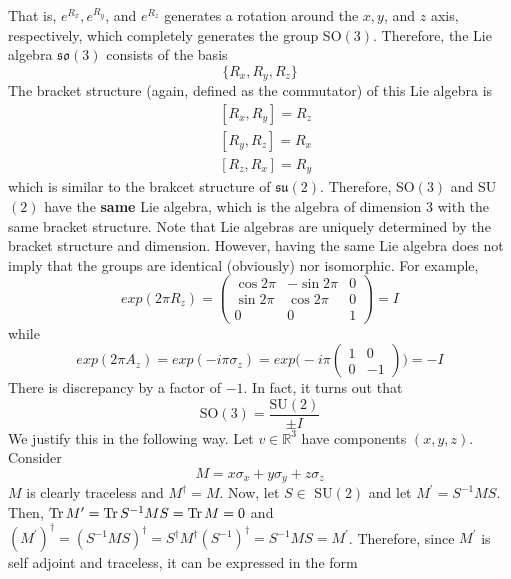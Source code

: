   That is, $e^{R_x}, e^{R_y}$, and $e^{R_z}$ generates a rotation around the $x, y$, and $z$ axis, respectively, which completely generates the group SO$(3)$. Therefore, the Lie algebra $\mathfrak{so}(3)$ consists of the basis 
  \begin{equation}
    \{R_x, R_y, R_z\}
  \end{equation}
  The bracket structure (again, defined as the commutator) of this Lie algebra is 
  \begin{align*}
    & [R_x, R_y] = R_z \\
    & [R_y, R_z] = R_x \\
    & [R_z, R_x] = R_y
  \end{align*}
  which is similar to the brakcet structure of $\mathfrak{su}(2)$. Therefore, SO$(3)$ and SU$(2)$ have the \textbf{same} Lie algebra, which is the algebra of dimension 3 with the same bracket structure. Note that Lie algebras are uniquely determined by the bracket structure and dimension. However, having the same Lie algebra does not imply that the groups are identical (obviously) nor isomorphic. For example, 
  \begin{equation}
    exp(2\pi R_z) = \begin{pmatrix}
    \cos{2\pi} & -\sin{2\pi} & 0 \\
    \sin{2\pi} & \cos{2\pi} & 0 \\
    0 & 0 & 1
    \end{pmatrix} = I
  \end{equation}
  while 
  \begin{equation}
    exp(2\pi A_z) = 
    exp(-i \pi \sigma_z) = exp \bigg(-i \pi \begin{pmatrix}
    1&0\\0&-1
    \end{pmatrix} \bigg) = -I
  \end{equation}
  There is discrepancy by a factor of $-1$. In fact, it turns out that
  \begin{equation}
    \text{SO}(3) = \frac{\text{SU}(2)}{\pm I}
  \end{equation}
  We justify this in the following way. Let $v \in \mathbb{R}^3$ have components $(x, y, z)$. Consider
  \begin{equation}
    M = x \sigma_x + y \sigma_y + z \sigma_z
  \end{equation}
  $M$ is clearly traceless and $M^\dagger = M$. Now, let $S \in$ SU$(2)$ and let $M^\prime = S^{-1} M S$. Then, $\Tr{M^\prime} = \Tr{S^{-1} M S} = \Tr{M} = 0$ and $(M^\prime)^\dagger = (S^{-1} M S)^\dagger = S^\dagger M^\dagger (S^{-1})^\dagger = S^{-1} M S = M^\prime$. Therefore, since $M^\prime$ is self adjoint and traceless, it can be expressed in the form
